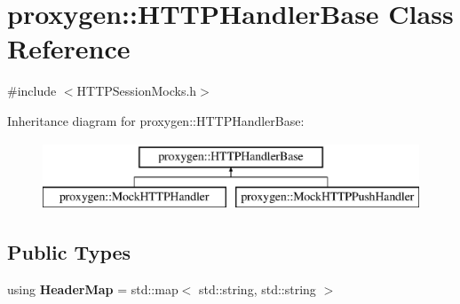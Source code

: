 \section{proxygen\+:\+:H\+T\+T\+P\+Handler\+Base Class Reference}
\label{classproxygen_1_1HTTPHandlerBase}


{\ttfamily \#include $<$H\+T\+T\+P\+Session\+Mocks.\+h$>$}

Inheritance diagram for proxygen\+:\+:H\+T\+T\+P\+Handler\+Base\+:\begin{figure}[H]
\begin{center}
\leavevmode
\includegraphics[height=2.000000cm]{classproxygen_1_1HTTPHandlerBase}
\end{center}
\end{figure}
\subsection*{Public Types}
\begin{DoxyCompactItemize}
\item 
using {\bf Header\+Map} = std\+::map$<$ std\+::string, std\+::string $>$
\end{DoxyCompactItemize}
